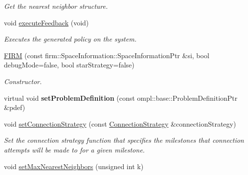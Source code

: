 \begin{DoxyCompactItemize}
\begin{DoxyCompactList}\small\item\em \-Get the nearest neighbor structure. \end{DoxyCompactList}\item 
\hypertarget{class_f_i_r_m_ae448791d4c9af9016bc9d5e9de166f0e}{void \hyperlink{class_f_i_r_m_ae448791d4c9af9016bc9d5e9de166f0e}{execute\-Feedback} (void)}\label{class_f_i_r_m_ae448791d4c9af9016bc9d5e9de166f0e}

\begin{DoxyCompactList}\small\item\em \-Executes the generated policy on the system. \end{DoxyCompactList}\item 
\hypertarget{class_f_i_r_m_a45dfdcb347763c633bf46ee653c35ce9}{\hyperlink{class_f_i_r_m_a45dfdcb347763c633bf46ee653c35ce9}{\-F\-I\-R\-M} (const firm\-::\-Space\-Information\-::\-Space\-Information\-Ptr \&si, bool debug\-Mode=false, bool star\-Strategy=false)}\label{class_f_i_r_m_a45dfdcb347763c633bf46ee653c35ce9}

\begin{DoxyCompactList}\small\item\em \-Constructor. \end{DoxyCompactList}\item 
\hypertarget{class_f_i_r_m_aeff5c0ced89bd2968b74693c2f7b5b5e}{virtual void {\bfseries set\-Problem\-Definition} (const ompl\-::base\-::\-Problem\-Definition\-Ptr \&pdef)}\label{class_f_i_r_m_aeff5c0ced89bd2968b74693c2f7b5b5e}

\item 
void \hyperlink{class_f_i_r_m_a8017d1847e682f39c2cbce33e904af57}{set\-Connection\-Strategy} (const \hyperlink{class_f_i_r_m_a15cfbcaf52c0bdd5e6c1a969bbf7ea1e}{\-Connection\-Strategy} \&connection\-Strategy)
\begin{DoxyCompactList}\small\item\em \-Set the connection strategy function that specifies the milestones that connection attempts will be made to for a given milestone. \end{DoxyCompactList}\item 
\hypertarget{class_f_i_r_m_a2a87b6c094c21b956a469a2b69cd387c}{void \hyperlink{class_f_i_r_m_a2a87b6c094c21b956a469a2b69cd387c}{set\-Max\-Nearest\-Neighbors} (unsigned int k)}\label{class_f_i_r_m_a2a87b6c094c21b956a469a2b69cd387c}


\end{DoxyCompactItemize}

